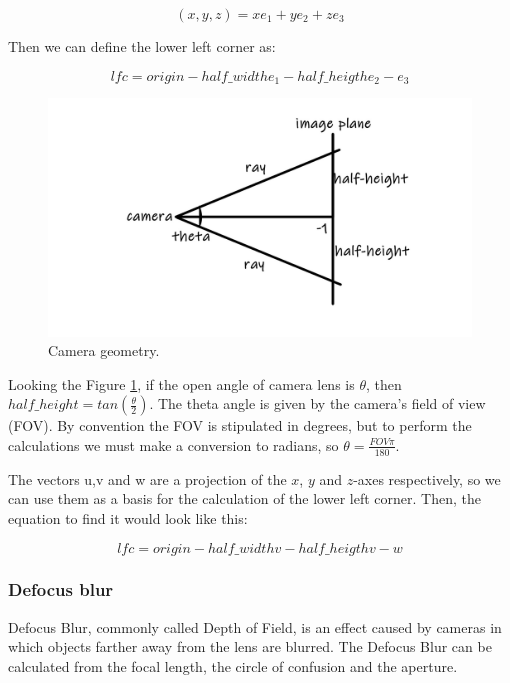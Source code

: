 \documentclass[titlepage,12pt]{report}
\begin{document}
\begin{equation}
(x,y,z) = xe_1 + ye_2 + ze_3
\end{equation}

Then we can define the lower left corner as:

\begin{equation}
lfc = origin - half\_width e_1 - half\_heigth e_2 - e_3
\end{equation}

\begin{figure}[!ht]
	\centering
	\includegraphics[scale=0.65]{media/camera-model-summary-0.jpg}
	\caption{Camera geometry.}
	\label{camegeom2}
\end{figure}

Looking the Figure \ref{camegeom2}, if the open angle of camera lens is $\theta$, then $half\_height = tan(\frac{\theta}{2})$. The theta angle is given by the camera's field of view (FOV). By convention the FOV is stipulated in degrees, but to perform the calculations we must make a conversion to radians, so $\theta = \frac{FOV \pi}{180}$.

The vectors u,v and w are a projection of the $x$, $y$ and $z$-axes respectively, so we can use them as a basis for the calculation of the lower left corner. Then, the equation to find it would look like this:

\begin{equation}
lfc = origin - half\_width v - half\_heigth v - w
\end{equation}

\subsubsection{Defocus blur}

Defocus Blur, commonly called Depth of Field, is an effect caused by cameras in which objects farther away from the lens are blurred. The Defocus Blur can be calculated from the focal length, the circle of confusion and the aperture.
\end{document}
